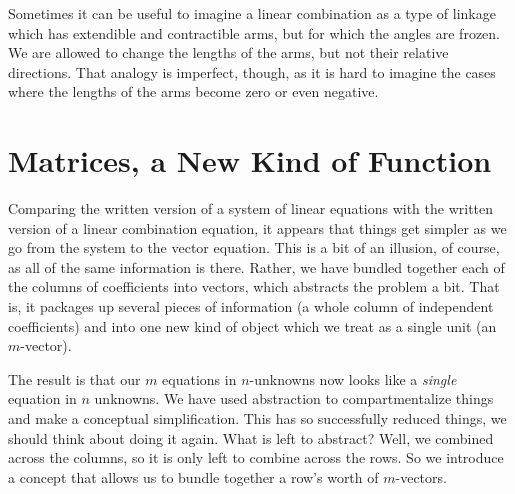 \documentclass[00-livre-main.tex]{subfiles}
\begin{document}
Sometimes it can be useful to imagine a linear combination as a type of linkage which has extendible and contractible arms, but for which the angles are frozen. We are allowed to change the lengths of the arms, but not their relative directions. That analogy is imperfect, though, as it is hard to imagine the cases where the lengths of the arms become zero or even negative.


\section{Matrices, a New Kind of Function}

Comparing the written version of a system of linear equations with the written version of a linear combination equation, it appears that things get simpler as we go from the system to the vector equation. This is a bit of an illusion, of course, as all of the same information is there. Rather, we have bundled together each of the columns of coefficients into vectors, which abstracts the problem a bit. That is, it packages up several pieces of information (a whole column of independent coefficients) and into one new kind of object which we treat as a single unit (an $m$-vector).

The result is that our $m$ equations in $n$-unknowns now looks like a \emph{single} equation in $n$ unknowns. We have used abstraction to compartmentalize things and make a conceptual simplification. This has so successfully reduced things, we should think about doing it again. What is left to abstract? Well, we combined across the columns, so it is only left to combine across the rows. So we introduce a concept that allows us to bundle together a row's worth of $m$-vectors.
\end{document}
